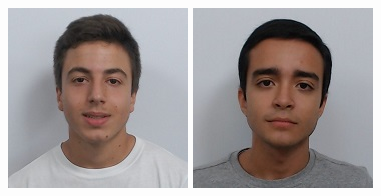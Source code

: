 \documentclass[11pt]{article}
\begin{document}
\begin{titlepage}
\begin{center}
    	\begin{figure}[hbt!]
                \includegraphics[width=\linewidth]{images/capa/80.jpeg} 
                \centering
                \captionsetup{A89597}
            \endminipage
            \hfill
                \includegraphics[width=\linewidth]{images/capa/154.jpeg} 

\end{figure}
\end{center}
\end{titlepage}
\end{document}
